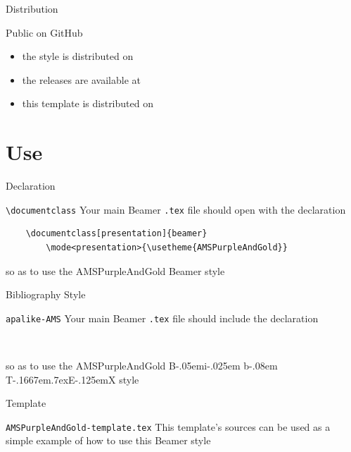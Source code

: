 \documentclass[presentation,cesena,apice]{beamer}\mode<presentation>{\usetheme{AMSPurpleAndGold}}
\def\BibTeX{{\rm B\kern-.05em{\sc i\kern-.025em b}\kern-.08em
    T\kern-.1667em\lower.7ex\hbox{E}\kern-.125emX}}
\begin{document}
\begin{frame}[c]{Distribution}
%
\begin{block}{Public on GitHub}
	\begin{itemize}
		\item the style is distributed on 
		\item the releases are available at 
		\item this template is distributed on 
	\end{itemize}
\end{block}
%
\end{frame}

\section{Use}

\begin{frame}[c,fragile]{Declaration}
%
\begin{block}{\texttt{\textbackslash{}documentclass}}
Your main Beamer \texttt{.tex} file should open with the declaration
%
\begin{verbatim}
    \documentclass[presentation]{beamer}
        \mode<presentation>{\usetheme{AMSPurpleAndGold}}
\end{verbatim}
%
so as to use the AMSPurpleAndGold Beamer style
\end{block}
%
\end{frame}

\begin{frame}[c,fragile]{Bibliography Style}
%
\begin{block}{\texttt{apalike-AMS}}
Your main Beamer \texttt{.tex} file should include the declaration
\begin{verbatim}
    
\end{verbatim}
so as to use the AMSPurpleAndGold \BibTeX{} style
\end{block}
%
\end{frame}

\begin{frame}[c,fragile]{Template}
%
\begin{block}{\texttt{AMSPurpleAndGold-template.tex}}
This template's sources can be used as a simple example of how to use this Beamer style
\end{block}
%
\end{frame}
\end{document}
